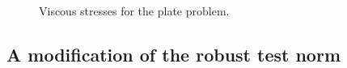 \begin{figure}[!h]
\centering
{}
\caption{Viscous stresses for the plate problem.  }
\label{fig:plateStresses}
\end{figure}

\subsection{A modification of the robust test norm}


